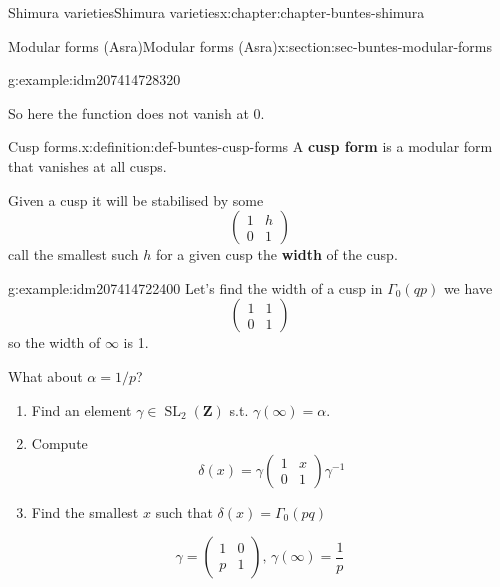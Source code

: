 \documentclass[oneside,10pt,]{book}
\newcommand{\terminology}[1]{\textbf{#1}}
\numberwithin{equation}{section}
\newcommand{\inv}{^{-1}}
\newcommand{\ZZ}{\mathbf{Z}}
\DeclareMathOperator{\SL}{SL}
\newcommand{\amp}{&}
\begin{document}
\begin{chapterptx}{Shimura varieties}{}{Shimura varieties}{}{}{x:chapter:chapter-buntes-shimura}
\begin{sectionptx}{Modular forms (Asra)}{}{Modular forms (Asra)}{}{}{x:section:sec-buntes-modular-forms}
\begin{example}{}{g:example:idm207414728320}
\begin{equation*}
\end{equation*}
%
\par
So here the function does not vanish at 0.%
\end{example}
\begin{definition}{Cusp forms.}{x:definition:def-buntes-cusp-forms}%
A \terminology{cusp form} is a modular form that vanishes at all cusps.%
\end{definition}
Given a cusp it will be stabilised by some%
\begin{equation*}
\begin{pmatrix} 1\amp h \\ 0 \amp 1 \end{pmatrix}
\end{equation*}
call the smallest such \(h\) for a given cusp the \terminology{width} of the cusp.%
\begin{example}{}{g:example:idm207414722400}%
Let's find the width of a cusp in \(\Gamma_0(qp)\) we have%
\begin{equation*}
\begin{pmatrix} 1\amp 1 \\ 0 \amp 1 \end{pmatrix}
\end{equation*}
so the width of \(\infty\) is 1.%
\par
What about \(\alpha = 1/p\)?%
\begin{enumerate}
\item{}Find an element \(\gamma \in \SL_2(\ZZ)\) s.t. \(\gamma(\infty) = \alpha\).%
\item{}Compute%
\begin{equation*}
\delta(x) = \gamma \begin{pmatrix} 1\amp x \\ 0 \amp 1 \end{pmatrix} \gamma\inv
\end{equation*}
%
\item{}Find the smallest \(x\) such that \(\delta(x) = \Gamma_0(pq)\)%
\end{enumerate}
%
\begin{equation*}
\gamma = \begin{pmatrix} 1\amp 0 \\ p \amp 1 \end{pmatrix},\, \gamma(\infty) = \frac 1p
\end{equation*}
%
\begin{equation*}

\end{equation*}
\end{example}
\end{sectionptx}
\end{chapterptx}
\end{document}
